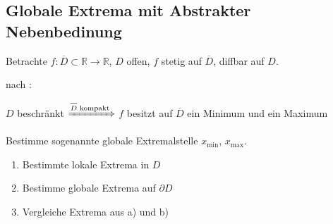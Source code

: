 \subsection{Globale Extrema mit Abstrakter Nebenbedinung}
Betrachte $f:\overline{D}\subset\mathbb{R}\to\mathbb{R}$, $D$ offen, $f$ stetig auf $\overline{D}$, \gls{diffbar} auf $D$.

\begin{boldenvironment}[Existenz]
	nach :
	
	$D$ beschränkt $\xRightarrow{\text{$\overline{D}$ kompakt}}$ $f$ besitzt auf $\overline{D}$ ein Minimum und ein Maximum
\end{boldenvironment}

\begin{boldenvironment}[Frage]
	Bestimme sogenannte globale Extremalstelle $x_{\min}$, $x_{\max}$.
\end{boldenvironment}

\begin{boldenvironment}[Strategie:]\vspace*{0pt}
	\begin{enumerate}[label={\alph*)},topsep=\dimexpr-\baselineskip/2\relax]
		\item Bestimmte lokale Extrema in $D$
		\item Bestimme globale Extrema auf $\partial D$
		\item Vergleiche Extrema aus a) und b)
	\end{enumerate}
\end{boldenvironment}

